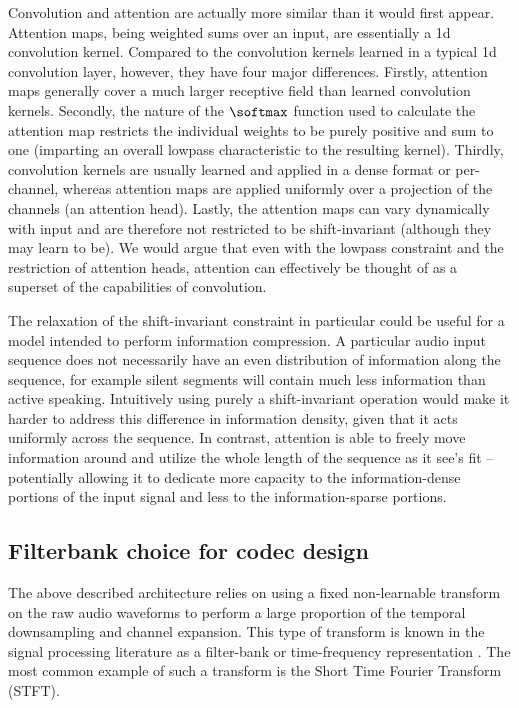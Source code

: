 \documentclass{article} %
\begin{document}
Convolution and attention are actually more similar than it would first appear. Attention maps, being weighted sums over an input, are essentially a 1d convolution kernel. Compared to the convolution kernels learned in a typical 1d convolution layer, however, they have four major differences. Firstly, attention maps generally cover a much larger receptive field than learned convolution kernels. Secondly, the nature of the $\softmax$ function used to calculate the attention map restricts the individual weights to be purely positive and sum to one (imparting an overall lowpass characteristic to the resulting kernel). Thirdly, convolution kernels are usually learned and applied in a dense format or per-channel, whereas attention maps are applied uniformly over a projection of the channels (an attention head). Lastly, the attention maps can vary dynamically with input and are therefore not restricted to be shift-invariant (although they may learn to be). We would argue that even with the lowpass constraint and the restriction of attention heads, attention can effectively be thought of as a superset of the capabilities of convolution.

The relaxation of the shift-invariant constraint in particular could be useful for a model intended to perform information compression. A particular audio input sequence does not necessarily have an even distribution of information along the sequence, for example silent segments will contain much less information than active speaking. Intuitively using purely a shift-invariant operation would make it harder to address this difference in information density, given that it acts uniformly across the sequence. In contrast, attention is able to freely move information around and utilize the whole length of the sequence as it see's fit \--- potentially allowing it to dedicate more capacity to the information-dense portions of the input signal and less to the information-sparse portions.

\subsection{Filterbank choice for codec design}
\label{app:filterbanks}
The above described architecture relies on using a fixed non-learnable transform on the raw audio waveforms to perform a large proportion of the temporal downsampling and channel expansion. This type of transform is known in the signal processing literature as a filter-bank or time-frequency representation \citep{jos}. The most common example of such a transform is the Short Time Fourier Transform (STFT).
\end{document}
